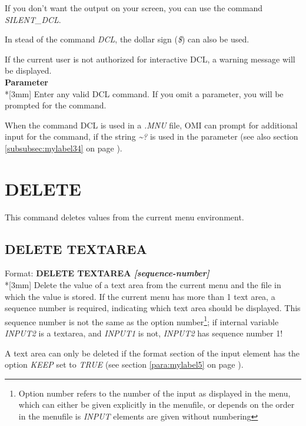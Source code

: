 \documentclass[a4paper]{book}
\newcommand{\vs}{\vspace{3mm}}
\renewcommand{\indent}{\hspace*{5mm}}
\begin{document}
If you don't want the output on your screen, you can use the command 
\textsl{SILENT{\_}DCL}.

\vs

In stead of the command \textsl{DCL}, the dollar sign 
(\textsl{{\$}})\index{{\$}} can also be used.

\vs

If the current user is not authorized for interactive DCL, a warning message 
will be displayed.\\[3mm]
\textbf{Parameter}\\*[3mm]
Enter any valid DCL command. If you omit a parameter, you will be prompted 
for the command.

When the command DCL is used in a \textsl{.MNU} file, OMI can prompt for additional 
input for the command, if the string \textsl{\~{}?} is used in the parameter
(see also section \ref{subsubsec:mylabel34} on page \pageref{para:dyninput}).

\section{DELETE}
\label{subsec:delete}

This command deletes values from the current menu environment.

\subsection{DELETE TEXTAREA}
\label{subsubsec:delete}

\indent Format: \textbf{DELETE TEXTAREA \textit{[sequence-number]}}\\*[3mm]
Delete the value of a text area from the current menu and the file in which 
the value is stored. If the current menu has more than 1 text area, a 
sequence number is required, indicating which text area should be displayed. 
This sequence number is not the same as the option number\footnote{\label{footnote:optionnumber} Option number refers to the number
of the input as displayed in the menu, which can either be given explicitly in the menufile, or
depends on the order in the menufile is \textsl{INPUT} elements are given without numbering}; if internal variable \textsl{INPUT2} is a textarea, and \textsl{INPUT1} is not, \textsl{INPUT2} has sequence number 1!

A text area can only be deleted if the format section of the input element 
has the option \textsl{KEEP} set to \textsl{TRUE} (see section \ref{para:mylabel5} on page \pageref{para:mylabel5}).
\end{document}

